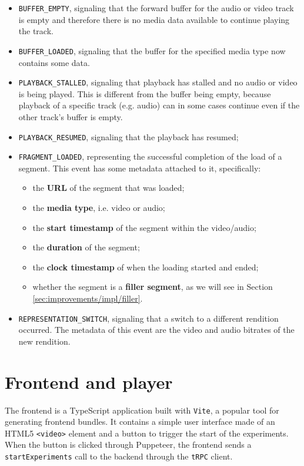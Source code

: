 \begin{itemize}
    \item \texttt{BUFFER\_EMPTY}, signaling that the forward buffer for the audio or video track is empty and therefore there is no media data available to continue playing the track.
    \item \texttt{BUFFER\_LOADED}, signaling that the buffer for the specified media type now contains some data.
    \item \texttt{PLAYBACK\_STALLED}, signaling that playback has stalled and no audio or video is being played. This is different from the buffer being empty, because playback of a specific track (e.g. audio) can in some cases continue even if the other track's buffer is empty.
    \item \texttt{PLAYBACK\_RESUMED}, signaling that the playback has resumed;
    \item \texttt{FRAGMENT\_LOADED}, representing the successful completion of the load of a segment. This event has some metadata attached to it, specifically:
        \begin{itemize}
            \item the \textbf{URL} of the segment that was loaded;
            \item the \textbf{media type}, i.e. video or audio;
            \item the \textbf{start timestamp} of the segment within the video/audio;
            \item the \textbf{duration} of the segment;
            \item the \textbf{clock timestamp} of when the loading started and ended;
            \item whether the segment is a \textbf{filler segment}, as we will see in Section \ref{sec:improvements/impl/filler}.
        \end{itemize}
    \item \texttt{REPRESENTATION\_SWITCH}, signaling that a switch to a different rendition occurred. The metadata of this event are the video and audio bitrates of the new rendition.
\end{itemize}

\section{Frontend and player}
\label{sec:testbed/frontend}

The frontend is a TypeScript application built with \texttt{Vite}, a popular tool for generating frontend bundles. It contains a simple user interface made of an HTML5 \texttt{<video>} element and a button to trigger the start of the experiments. When the button is clicked through Puppeteer, the frontend sends a \texttt{startExperiments} call to the backend through the \texttt{tRPC} client.

